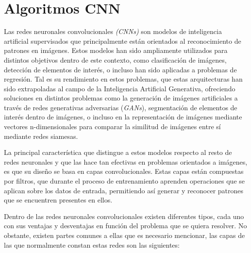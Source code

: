 \documentclass{uathesis-es}
\begin{document}
	\section{Algoritmos CNN}
	\label{CNN_SECTION}
	
	
	
	Las redes neuronales convolucionales \textit{(CNNs)} son modelos de inteligencia artificial supervisados que principalmente están orientados al reconocimiento de patrones en imágenes. Estos modelos han sido ampliamente utilizados para distintos objetivos dentro de este contexto, como clasificación de imágenes, detección de elementos de interés, o incluso han sido aplicadas a problemas de regresión. Tal es su rendimiento en estos problemas, que estas arquitecturas han sido extrapoladas al campo de la Inteligencia Artificial Generativa, ofreciendo soluciones en distintos problemas como la generación de imágenes artificiales a través de redes generativas adversarias (\textit{GANs}), segmentación de elementos de interés dentro de imágenes, o incluso en la representación de imágenes mediante vectores n-dimensionales para comparar la similitud de imágenes entre sí mediante redes siamesas.
	
	La principal característica que distingue a estos modelos respecto al resto de redes neuronales y que las hace tan efectivas en problemas orientados a imágenes, es que su diseño se basa en capas convolucionales. Estas capas están compuestas por filtros, que durante el proceso de entrenamiento aprenden operaciones que se aplican sobre los datos de entrada, permitiendo así generar y reconocer patrones que se encuentren presentes en ellos.
	
	Dentro de las redes neuronales convolucionales existen diferentes tipos, cada uno con sus ventajas y desventajas en función del problema que se quiera resolver. No obstante, existen partes comunes a ellas que es necesario mencionar, las capas de las que normalmente constan estas redes son las siguientes:
	
\end{document}
